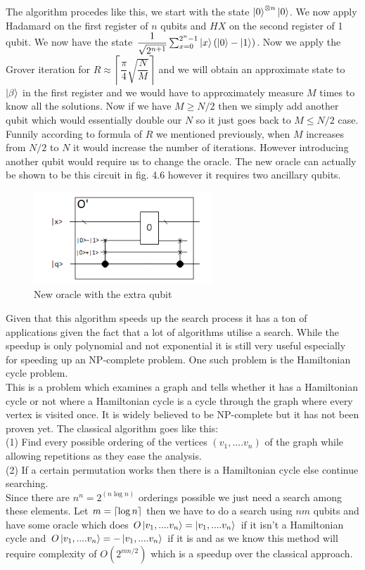 \documentclass{report}
\DeclarePairedDelimiter{\ceil}{\lceil}{\rceil}
\begin{document}
The algorithm procedes like this, we start with the state $\ket{0}^{\otimes{n}}\ket{0}$. We now apply Hadamard on the first register of $n$ qubits and $HX$ on the second register of 1 qubit. We now have the state $\dfrac{1}{\sqrt{2^{n+1}}}\sum_{x=0}^{2^{n}-1}\ket{x}(\ket{0} - \ket{1})$. Now we apply the Grover iteration for $R \approx \left\lceil{\dfrac{\pi}{4}\sqrt{\dfrac{N}{M}}}\right\rceil$ and we will obtain an approximate state to $\ket{\beta}$ in the first register and we would have to approximately measure $M$ times to know all the solutions. Now if we have $M \geq N/2$ then we simply add another qubit which would essentially double our $N$ so it just goes back to $M \leq N/2$ case. Funnily according to formula of $R$ we mentioned previously, when $M$ increases from $N/2$ to $N$ it would increase the number of iterations. However introducing another qubit would require us to change the oracle. The new oracle can actually be shown to be this circuit in fig. 4.6 however it requires two ancillary qubits. 
\begin{figure}[ht]
    \centering
    \includegraphics[width = 0.6\textwidth]{images/oracle stuff.png}
    \caption{New oracle with the extra qubit}
\end{figure}
Given that this algorithm speeds up the search process it has a ton of applications given the fact that a lot of algorithms utilise a search. While the speedup is only polynomial and not exponential it is still very useful especially for speeding up an NP-complete problem. One such problem is the Hamiltonian cycle problem.\\
This is a problem which examines a graph and tells whether it has a Hamiltonian cycle or not where a Hamiltonian cycle is a cycle through the graph where every vertex is visited once. It is widely believed to be NP-complete but it has not been proven yet. The classical algorithm goes like this:\\
(1) Find every possible ordering of the vertices $(v_1,....v_n)$ of the graph while allowing repetitions as they ease the analysis.\\
(2) If a certain permutation works then there is a Hamiltonian cycle else continue searching.\\ 
Since there are $n^n = 2^(n\log{n})$ orderings possible we just need a search among these elements. Let $m = \ceil{\log{n}}$ then we have to do a search using $nm$ qubits and have some oracle which does $O\ket{v_1,....v_n} = \ket{v_1,....v_n}$ if it isn't a Hamiltonian cycle and $O\ket{v_1,....v_n} = -\ket{v_1,....v_n}$ if it is and as we know this method will require complexity of $O(2^{mn/2})$ which is a speedup over the classical approach.
\end{document}
